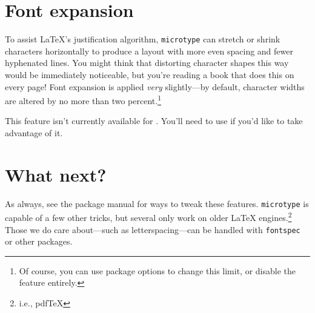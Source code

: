 \section{Font expansion}

To assist \LaTeX's justification algorithm,
\texttt{microtype} can
stretch or shrink characters horizontally to produce a layout
with more even spacing and fewer hyphenated lines.
You might think that distorting character shapes this way would be immediately
noticeable,
but you're reading a book that does this on every page!
Font expansion is applied \emph{very} slightly---by default,
character widths are altered by no more than two percent.\punckern\footnote{%
Of course, you can use package options to change this limit,
or disable the feature entirely.}

This feature isn't currently available for \XeLaTeX{}.
You'll need to use \LuaLaTeX{} if you'd like to take advantage of it.

\section{What next?}

As always, see the package manual for ways to tweak these features.
\texttt{microtype} is capable of a few other tricks,
but several only work on older \LaTeX{} engines.\punckern\footnote{i.e., pdf\TeX}
Those we do care about---such as letterspacing---can be handled with
\texttt{fontspec} or other packages.
